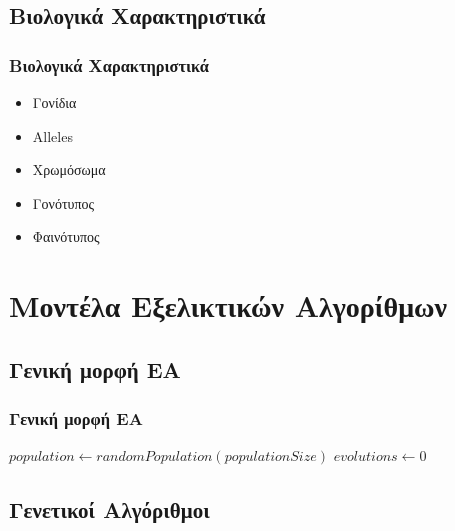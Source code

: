 \documentclass[xetex,mathserif,serif,14pt]{beamer}
\begin{document}
\subsection{Βιολογικά Χαρακτηριστικά}

\begin{frame}
\frametitle{Βιολογικά Χαρακτηριστικά}
    \begin{itemize}
      \item Γονίδια
      \item Alleles
      \item Χρωμόσωμα
      \item Γονότυπος
      \item Φαινότυπος
    \end{itemize}
\end{frame}

\section{Μοντέλα Εξελικτικών Αλγορίθμων}

\subsection{Γενική μορφή ΕΑ}

\begin{frame}
\frametitle{Γενική μορφή ΕΑ}
\begin{algorithm}[H]
    $population \gets randomPopulation(populationSize)$\;
    $evolutions \gets 0$\;
    \;
\end{algorithm}
\end{frame}

\subsection{Γενετικοί Αλγόριθμοι}
\end{document}
